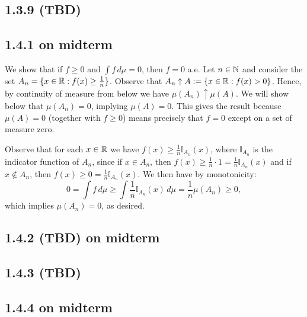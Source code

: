\documentclass[11pt]{article}
\begin{document}
\subsection*{1.3.9 (TBD)}

\subsection*{1.4.1 on midterm}

We show that if $f \geq 0$ and $\int f \, d\mu = 0$, then $f = 0$ a.e. Let $n \in {\mathbb N}$ and consider the set $A_n = \{x \in {\mathbb R} : f(x) \geq \frac{1}{n}\}$. Observe that $A_n \uparrow A := \{x \in {\mathbb R} : f(x) > 0\}$. Hence, by continuity of measure from below we have $\mu(A_n)\uparrow \mu(A)$. We will show below that $\mu(A_n) = 0$, implying $\mu(A) = 0$. This gives the result because $\mu(A) = 0$ (together with $f \geq 0$) means precisely that $f = 0$ except on a set of measure zero.

Observe that for each $x \in {\mathbb R}$ we have $f(x) \geq  \frac{1}{n} \mathbb{I}_{A_n}(x)$, where $\mathbb{I}_{A_n}$ is the indicator function of $A_n$, since if $x \in A_n$, then $f(x) \geq \frac{1}{n} \cdot 1 = \frac{1}{n}\mathbb{I}_{A_n}(x)$ and if $x \notin A_n$, then $f(x) \geq 0 = \frac{1}{n}\mathbb{I}_{A_n}(x)$. We then have by monotonicity: \[0 = \int f \, d\mu  \geq \int  \frac{1}{n}\mathbb{I}_{A_n}(x)\, d\mu  =  \frac{1}{n}\mu(A_n) \geq 0,\] which implies $\mu(A_n) = 0$, as desired.

\subsection*{1.4.2 (TBD) on midterm}






\subsection*{1.4.3 (TBD)}

\subsection*{1.4.4 on midterm}
\end{document}
